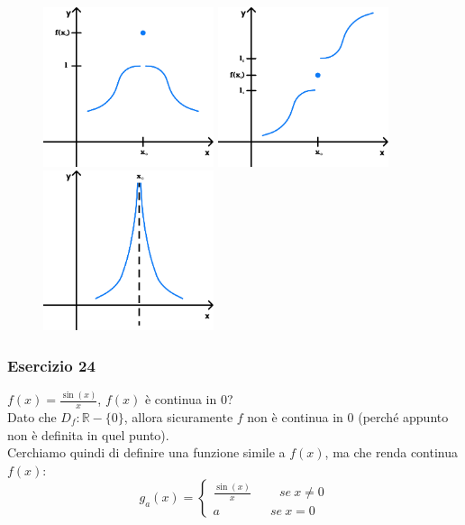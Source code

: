 \documentclass{article}
\begin{document}
\begin{figure}[!h]
    \centering
    \includegraphics[width=5cm]{./images/discontinuity3.pdf}\hfill
    \includegraphics[width=5cm]{./images/discontinuity1.pdf}\hfill
    \includegraphics[width=5cm]{./images/discontinuity2.pdf}
\end{figure}

\subsubsection{Esercizio 24}
$f(x) = \frac{\sin(x)}{x}$, $f(x)$ è continua in $0$? \\

\noindent Dato che $D_f: \mathbb{R} - \{0\}$, allora sicuramente $f$ non è continua in $0$ (perché appunto non è definita in quel punto).\\
Cerchiamo quindi di definire una funzione simile a $f(x)$, ma che renda continua $f(x)$:
\begin{equation*}
    g_a(x) = 
    \begin{cases}
        \frac{\sin(x)}{x} \qquad \ se \ x \neq 0\\
        a \qquad \qquad se \ x = 0
    \end{cases}
\end{equation*}
\end{document}
